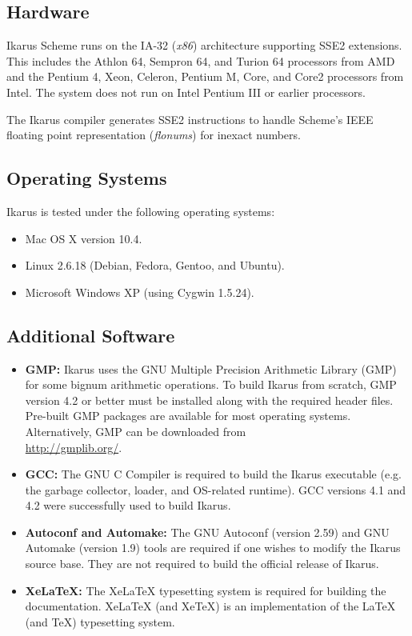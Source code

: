 \documentclass[onecolumn, 12pt, twoside, openright, dvipdfm]{book}
\begin{document}
\subsection{Hardware}

Ikarus Scheme runs on the IA-32 (\emph{x86}) architecture
supporting SSE2 extensions.  This includes the Athlon 64,
Sempron 64, and Turion 64 processors from AMD and the Pentium 4, Xeon,
Celeron, Pentium M, Core, and Core2 processors from Intel.  The
system does not run on Intel Pentium III or earlier
processors.

The Ikarus compiler generates SSE2 instructions to handle Scheme's
IEEE floating point representation (\emph{flonums}) for inexact
numbers. 

\subsection{Operating Systems}

Ikarus is tested under the following operating systems:

\begin{itemize}
\item Mac OS X version 10.4.
\item Linux 2.6.18 (Debian, Fedora, Gentoo, and Ubuntu).
\item Microsoft Windows XP (using Cygwin 1.5.24).
\end{itemize}

\subsection{Additional Software}

\begin{itemize}
\item\textbf{GMP:} Ikarus uses the GNU Multiple Precision Arithmetic
Library (GMP) for some bignum arithmetic operations.  To build
Ikarus from scratch, GMP version 4.2 or better must be installed
along with the required header files.  Pre-built GMP packages  are
available for most operating systems.  Alternatively, GMP can be
downloaded from \\
\url{http://gmplib.org/}.

\item\textbf{GCC:} The GNU C Compiler is required to build the Ikarus
executable (e.g. the garbage collector, loader, and OS-related
runtime).  GCC versions 4.1 and 4.2 were successfully used to build
Ikarus.

\item\textbf{Autoconf and Automake:} The GNU Autoconf (version 2.59)
and GNU Automake (version 1.9) tools are required if one
wishes to modify the Ikarus source base.  They are not
required to build the official release of Ikarus.

\item\textbf{XeLaTeX:}  The XeLaTeX typesetting system is required
for building the documentation.  XeLaTeX (and XeTeX) is an
implementation of the LaTeX (and TeX) typesetting system.

\end{itemize}
\end{document}
